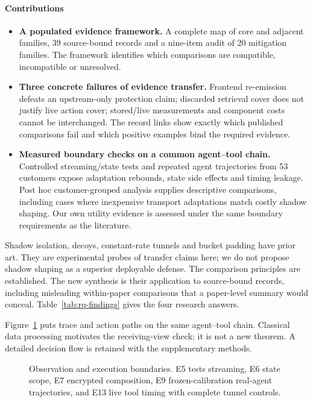 \paragraph{Contributions}
\begin{itemize}
\item \textbf{A populated evidence framework.} A complete map of \FinalCore{} core and \FinalAdjacent{} adjacent families, 39 source-bound records and a nine-item audit of 20 mitigation families. The framework identifies which comparisons are compatible, incompatible or unresolved.
\item \textbf{Three concrete failures of evidence transfer.} Frontend re-emission defeats an upstream-only protection claim; discarded retrieval cover does not justify live action cover; stored/live measurements and component costs cannot be interchanged. The record links show exactly which published comparisons fail and which positive examples bind the required evidence.
\item \textbf{Measured boundary checks on a common agent--tool chain.} Controlled streaming/state tests and repeated agent trajectories from 53 customers expose adaptation rebounds, state side effects and timing leakage. Post hoc customer-grouped analysis supplies descriptive comparisons, including cases where inexpensive transport adaptations match costly shadow shaping. Our own utility evidence is assessed under the same boundary requirements as the literature.
\end{itemize}
Shadow isolation, decoys, constant-rate tunnels and bucket padding have prior art. They are experimental probes of transfer claims here; we do not propose shadow shaping as a superior deployable defense. The comparison principles are established. The new synthesis is their application to source-bound records, including misleading within-paper comparisons that a paper-level summary would conceal. Table~\ref{tab:rq-findings} gives the four research answers.



Figure~\ref{fig:system-model} puts trace and action paths on the same agent--tool chain. Classical data processing motivates the receiving-view check; it is not a new theorem. A detailed decision flow is retained with the supplementary methods.
\begin{figure}[t]
\centering
\caption{Observation and execution boundaries. E5 tests streaming, E6 state scope, E7 encrypted composition, E9 frozen-calibration real-agent trajectories, and E13 live tool timing with complete tunnel controls.}
\label{fig:system-model}
\end{figure}
